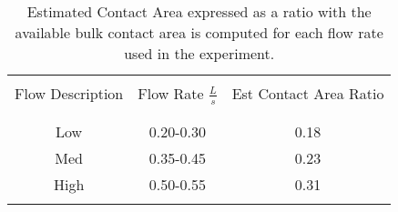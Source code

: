 \documentclass[a4paper,10pt]{scrreprt}
\begin{document}
\begin{table}[t] \label{contactT}
\centering                           
\caption{Estimated Contact Area expressed as a ratio with the available bulk contact area is computed for each flow rate used in the experiment.} 
\begin{tabular}{c c c}           
\\[1ex] 
\hline\hline
\\             
Flow Description & Flow Rate $\frac{L}{s}$ & Est Contact Area Ratio\\
\\
\hline
\\
Low & 0.20-0.30 & 0.18\\
Med & 0.35-0.45 & 0.23\\
High & 0.50-0.55 & 0.31\\
\\
\hline\hline
\end{tabular}
\label{tab:matrix}
\end{table}
\end{document}
